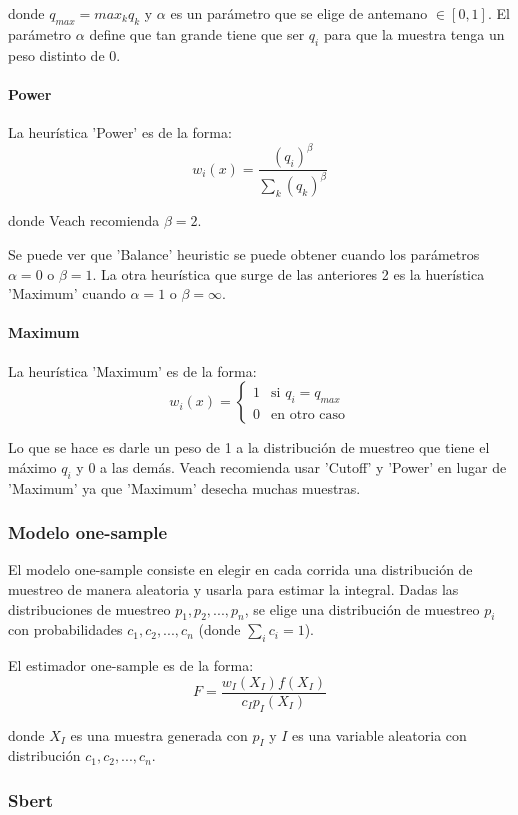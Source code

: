 \documentclass{article}
\begin{document}
donde $q_{max} = max_{k} q_{k}$ y $\alpha$ es un parámetro que se elige de antemano $\in [0, 1]$.
El parámetro $\alpha$ define que tan grande tiene que ser $q_{i}$ para que la muestra tenga un peso distinto de 0.

\paragraph{Power} La heurística 'Power' es de la forma:
$$ w_{i}(x) = \frac{(q_{i})^{\beta}}{\sum_{k} (q_{k})^{\beta}}$$

donde Veach recomienda $\beta = 2$.

Se puede ver que 'Balance' heuristic se puede obtener cuando los parámetros $\alpha = 0$ o $\beta = 1$.
La otra heurística que surge de las anteriores 2 es la huerística 'Maximum' cuando $\alpha = 1$ o $\beta = \infty$.

\paragraph{Maximum} La heurística 'Maximum' es de la forma:
$$ w_{i}(x) = \begin{cases} 1 & \text{si } q_{i} = q_{max} \\ 0 & \text{en otro caso} \end{cases}$$

Lo que se hace es darle un peso de 1 a la distribución de muestreo que tiene el máximo $q_{i}$ y 0 a las demás.
Veach recomienda usar 'Cutoff' y 'Power' en lugar de 'Maximum' ya que 'Maximum' desecha muchas muestras.

\subsubsection{Modelo one-sample}

El modelo one-sample consiste en elegir en cada corrida una distribución de muestreo de manera aleatoria y usarla para estimar la integral.
Dadas las distribuciones de muestreo $p_{1}, p_{2}, ..., p_{n}$, se elige una distribución de muestreo $p_{i}$ con probabilidades $c_{1}, c_{2}, ..., c_{n}$ (donde $\sum_{i} c_{i} = 1$).

El estimador one-sample es de la forma:
$$F = \frac{w_{I}(X_{I}) f(X_{I})}{c_{I} p_{I}(X_{I})}$$

donde $X_{I}$ es una muestra generada con $p_{I}$ y $I$ es una variable aleatoria con distribución $c_{1}, c_{2}, ..., c_{n}$.

\subsubsection{Sbert}
\end{document}
